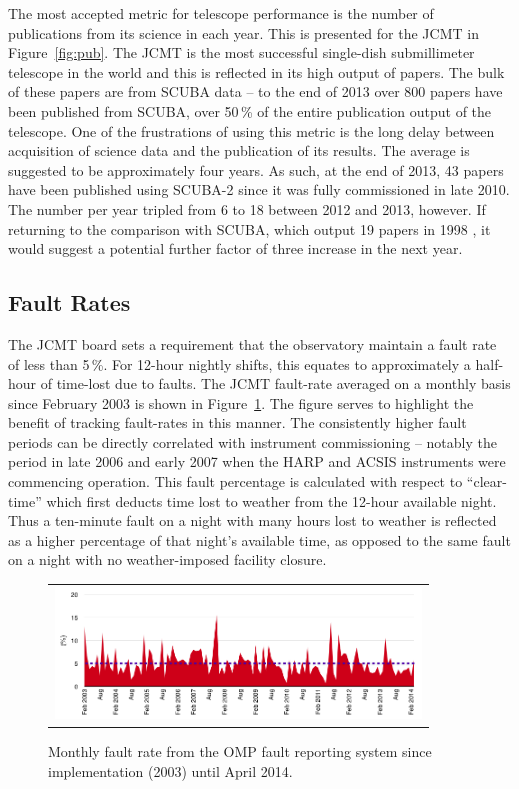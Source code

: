 \documentclass[]{spie}  %
\begin{document}
The most accepted metric for telescope performance is the number of
publications from its science in each year. This is presented for the
JCMT in Figure~\ref{fig:pub}. The JCMT is the most successful
single-dish submillimeter telescope in the world and this is reflected
in its high output of papers. The bulk of these papers are from SCUBA
data -- to the end of 2013 over 800 papers have been published from
SCUBA, over 50\,\% of the entire publication output of the
telescope. One of the frustrations of using this metric is the long
delay between acquisition of science data and the publication of its
results. The average is suggested to be approximately four years. As
such, at the end of 2013, 43 papers have been published using SCUBA-2
since it was fully commissioned in late 2010. The number per year
tripled from 6 to 18 between 2012 and 2013, however. If returning to
the comparison with SCUBA, which output 19 papers in 1998 , it would
suggest a potential further factor of three increase in the next year.


\subsection{Fault Rates}\label{sec:rates}

The JCMT board sets a requirement that the observatory maintain a
fault rate of less than 5\,\%. For 12-hour nightly shifts, this
equates to approximately a half-hour of time-lost due to faults. The
JCMT fault-rate averaged on a monthly basis since February 2003 is
shown in Figure~\ref{fig:fault}. The figure serves to highlight the
benefit of tracking fault-rates in this manner. The consistently
higher fault periods can be directly correlated with instrument
commissioning -- notably the period in late 2006 and early 2007 when
the HARP and ACSIS instruments were commencing operation. This fault
percentage is calculated with respect to ``clear-time'' which first
deducts time lost to weather from the 12-hour available night. Thus a
ten-minute fault on a night with many hours lost to weather is
reflected as a higher percentage of that night's available time, as
opposed to the same fault on a night with no weather-imposed facility
closure.

 \begin{figure}[t]
   \begin{center}
   \begin{tabular}{c}
   \includegraphics[height=3.5cm]{Faultrate2003_2014}
   \end{tabular}
   \end{center}
   \caption{\label{fig:fault}Monthly fault rate from the OMP fault reporting system since implementation (2003) until April 2014.}
\end{figure}
\end{document}
